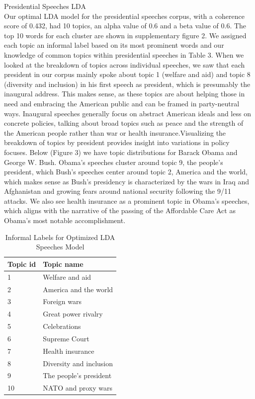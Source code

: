 \documentclass{article}
\begin{document}
{{Presidential Speeches LDA \\
Our optimal LDA model for the presidential speeches corpus, with a coherence score of 0.432, had 10 topics, an alpha value of 0.6 and a beta value of 0.6. The top 10 words for each cluster are shown in supplementary figure 2. 
We assigned each topic an informal label based on its most prominent words and our knowledge of common topics within presidential speeches in Table 3.
When we looked at the breakdown of topics across individual speeches, we saw that each president in our corpus mainly spoke about topic 1 (welfare and aid) and topic 8 (diversity and inclusion) in his first speech as president, which is presumably the inaugural address. This makes sense, as these topics are about helping those in need and embracing the American public and can be framed in party-neutral ways. Inaugural speeches generally focus on abstract American ideals and less on concrete policies, talking about broad topics such as peace and the strength of the American people rather than war or health insurance.Visualizing the breakdown of topics by president provides insight into variations in policy focuses. Below (Figure 3) we have topic distributions for Barack Obama and George W. Bush. Obama’s speeches cluster around topic 9, the people’s president, which Bush’s speeches center around topic 2, America and the world, which makes sense as Bush’s presidency is characterized by the wars in Iraq and Afghanistan and growing fears around national security following the 9/11 attacks. We also see health insurance as a prominent topic in Obama’s speeches, which aligns with the narrative of the passing of the Affordable Care Act as Obama’s most notable accomplishment.  

\begin{table}[H]
	\caption{Informal Labels for Optimized LDA Speeches Model}
	\centering
	\begin{tabular}{ll}
		\toprule
		\midrule
		Topic id  & Topic name \\
		\midrule
		\midrule
		1 & Welfare and aid \\
		\midrule
		2 & America and the world \\
		\midrule
		3 & Foreign wars \\
		\midrule
		4 & Great power rivalry \\
		\midrule
		5 & Celebrations \\
		\midrule
		6 & Supreme Court \\
		\midrule
		7 & Health insurance \\
		\midrule
		8 & Diversity and inclusion \\
		\midrule
		9 & The people’s president \\
		\midrule
		10 & NATO and proxy wars \\
		\bottomrule
	\end{tabular}
\end{table}

}}
\end{document}
